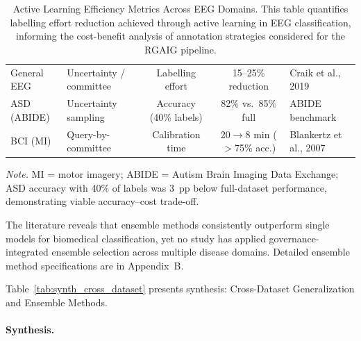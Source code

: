 \begin{table}[H]
\tablestripes\tablefontsize
\caption[Active Learning Efficiency Metrics Across EEG Domains]{Active Learning Efficiency Metrics Across EEG Domains. This table quantifies labelling effort reduction achieved through active learning in EEG classification, informing the cost-benefit analysis of annotation strategies considered for the RGAIG pipeline.}
\tablefontsize
\begin{tabularx}{\textwidth}{@{} >{\raggedright\arraybackslash}p{2cm} >{\raggedright\arraybackslash}p{3cm} C C L @{}}
\toprule
{} &  &  &  &  \\
\midrule
General EEG & Uncertainty / committee & Labelling effort & 15--25\% reduction & Craik et al., 2019 \\
\addlinespace
ASD (ABIDE) & Uncertainty sampling & Accuracy (40\% labels) & 82\% vs.\ 85\% full & ABIDE benchmark \\
\addlinespace
BCI (MI) & Query-by-committee & Calibration time & 20$\to$8 min ($>$75\% acc.) & Blankertz et al., 2007 \\
\bottomrule
\end{tabularx}
\vspace{0.5em}\noindent\textit{Note.} MI = motor imagery; ABIDE = Autism Brain Imaging Data Exchange;  ASD accuracy with 40\% of labels was 3~pp below full-dataset performance, demonstrating viable accuracy--cost trade-off.
\end{table}

\fi %


\noindent The literature reveals that ensemble methods consistently outperform single models for biomedical classification, yet no study has applied governance-integrated ensemble selection across multiple disease domains. Detailed ensemble method specifications are in Appendix~B.



\noindent Table~\ref{tab:synth_cross_dataset} presents synthesis: Cross-Dataset Generalization and Ensemble Methods.

\paragraph{Synthesis.}


